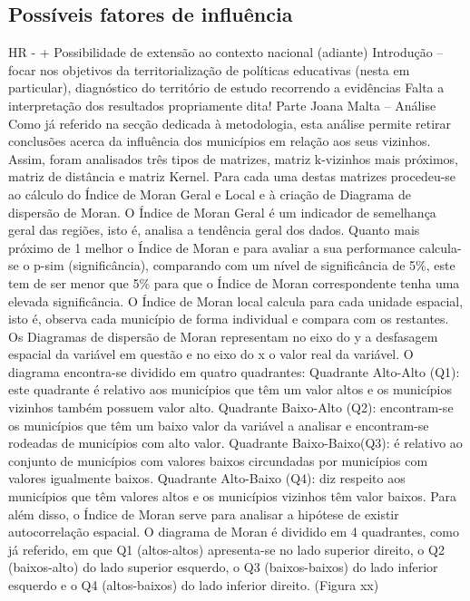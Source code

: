 \documentclass[
]{book}
\theoremstyle{definition}
\theoremstyle{definition}
\theoremstyle{definition}
\theoremstyle{definition}
\theoremstyle{remark}
\begin{document}
\hypertarget{possuxedveis-fatores-de-influuxeancia}{%
\subsection{Possíveis fatores de influência}\label{possuxedveis-fatores-de-influuxeancia}}

HR - + Possibilidade de extensão ao contexto nacional (adiante)
Introdução -- focar nos objetivos da territorialização de políticas educativas (nesta em particular), diagnóstico do território de estudo recorrendo a evidências
Falta a interpretação dos resultados propriamente dita!
Parte Joana Malta -- Análise
Como já referido na secção dedicada à metodologia, esta análise permite retirar conclusões acerca da influência dos municípios em relação aos seus vizinhos. Assim, foram analisados três tipos de matrizes, matriz k-vizinhos mais próximos, matriz de distância e matriz Kernel.
Para cada uma destas matrizes procedeu-se ao cálculo do Índice de Moran Geral e Local e à criação de Diagrama de dispersão de Moran.
O Índice de Moran Geral é um indicador de semelhança geral das regiões, isto é, analisa a tendência geral dos dados. Quanto mais próximo de 1 melhor o Índice de Moran e para avaliar a sua performance calcula-se o p-sim (significância), comparando com um nível de significância de 5\%, este tem de ser menor que 5\% para que o Índice de Moran correspondente tenha uma elevada significância.
O Índice de Moran local calcula para cada unidade espacial, isto é, observa cada município de forma individual e compara com os restantes. Os Diagramas de dispersão de Moran representam no eixo do y a desfasagem espacial da variável em questão e no eixo do x o valor real da variável. O diagrama encontra-se dividido em quatro quadrantes:
Quadrante Alto-Alto (Q1): este quadrante é relativo aos municípios que têm um valor altos e os municípios vizinhos também possuem valor alto.
Quadrante Baixo-Alto (Q2): encontram-se os municípios que têm um baixo valor da variável a analisar e encontram-se rodeadas de municípios com alto valor.
Quadrante Baixo-Baixo(Q3): é relativo ao conjunto de municípios com valores baixos circundadas por municípios com valores igualmente baixos.
Quadrante Alto-Baixo (Q4): diz respeito aos municípios que têm valores altos e os municípios vizinhos têm valor baixos.
Para além disso, o Índice de Moran serve para analisar a hipótese de existir autocorrelação espacial. O diagrama de Moran é dividido em 4 quadrantes, como já referido, em que Q1 (altos-altos) apresenta-se no lado superior direito, o Q2 (baixos-alto) do lado superior esquerdo, o Q3 (baixos-baixos) do lado inferior esquerdo e o Q4 (altos-baixos) do lado inferior direito. (Figura xx)
\end{document}
